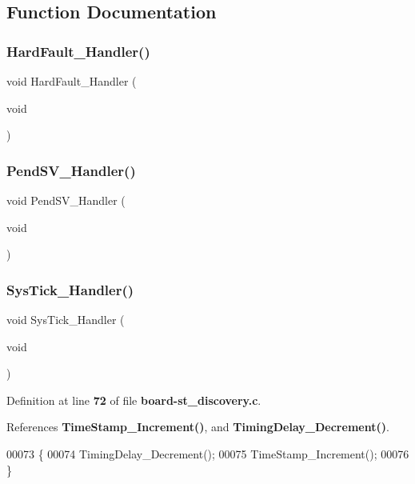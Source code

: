 \subsection{Function Documentation}
\mbox{\label{stm32f4xx__it_8h_a2bffc10d5bd4106753b7c30e86903bea}} 
\subsubsection{Hard\+Fault\+\_\+\+Handler()}
{\footnotesize\ttfamily void Hard\+Fault\+\_\+\+Handler (\begin{DoxyParamCaption}\item[{void}]{ }\end{DoxyParamCaption})}

\mbox{\label{stm32f4xx__it_8h_a6303e1f258cbdc1f970ce579cc015623}} 
\subsubsection{Pend\+S\+V\+\_\+\+Handler()}
{\footnotesize\ttfamily void Pend\+S\+V\+\_\+\+Handler (\begin{DoxyParamCaption}\item[{void}]{ }\end{DoxyParamCaption})}

\mbox{\label{stm32f4xx__it_8h_ab5e09814056d617c521549e542639b7e}} 
\subsubsection{Sys\+Tick\+\_\+\+Handler()}
{\footnotesize\ttfamily void Sys\+Tick\+\_\+\+Handler (\begin{DoxyParamCaption}\item[{void}]{ }\end{DoxyParamCaption})}



Definition at line \textbf{ 72} of file \textbf{ board-\/st\+\_\+discovery.\+c}.



References \textbf{ Time\+Stamp\+\_\+\+Increment()}, and \textbf{ Timing\+Delay\+\_\+\+Decrement()}.


\begin{DoxyCode}
00073 \{
00074     TimingDelay_Decrement();
00075     TimeStamp_Increment();
00076 \}
\end{DoxyCode}
